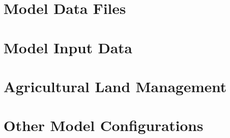 \section{Model Data Files}
	
\section{Model Input Data}
	
	
	
	
	
	
	
\pagebreak
\section{Agricultural Land Management}\label{sec:ag_land_mgt}
	

%		
	
\pagebreak
\section{Other Model Configurations}
	
	
	
	
	
	
\pagebreak